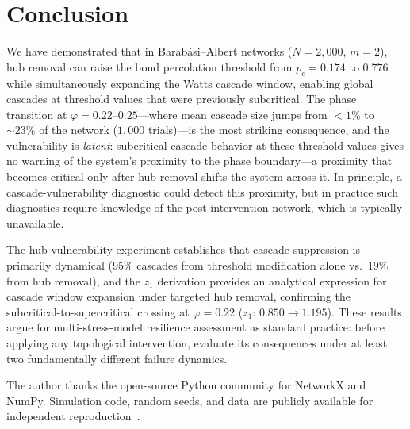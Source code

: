 \documentclass[aps,pre,twocolumn,superscriptaddress,showpacs]{revtex4-2}
\newcommand{\pc}{p_c}
\begin{document}
\section{Conclusion}
\label{sec:conclusion}

We have demonstrated that in Barab\'asi--Albert networks ($N=2{,}000$, $m=2$), hub removal can raise the bond percolation threshold from $\pc=0.174$ to $0.776$ while simultaneously expanding the Watts cascade window, enabling global cascades at threshold values that were previously subcritical. The phase transition at $\varphi=0.22$--$0.25$---where mean cascade size jumps from $<1\%$ to ${\sim}23\%$ of the network ($1{,}000$ trials)---is the most striking consequence, and the vulnerability is \emph{latent}: subcritical cascade behavior at these threshold values gives no warning of the system's proximity to the phase boundary---a proximity that becomes critical only after hub removal shifts the system across it. In principle, a cascade-vulnerability diagnostic could detect this proximity, but in practice such diagnostics require knowledge of the post-intervention network, which is typically unavailable.

The hub vulnerability experiment establishes that cascade suppression is primarily dynamical (95\% cascades from threshold modification alone vs.\ 19\% from hub removal), and the $z_1$ derivation provides an analytical expression for cascade window expansion under targeted hub removal, confirming the subcritical-to-supercritical crossing at $\varphi=0.22$ ($z_1$: $0.850 \to 1.195$). These results argue for multi-stress-model resilience assessment as standard practice: before applying any topological intervention, evaluate its consequences under at least two fundamentally different failure dynamics.

\begin{acknowledgments}
The author thanks the open-source Python community for NetworkX and NumPy. Simulation code, random seeds, and data are publicly available for independent reproduction~\cite{CacheroGitHub2026}.
\end{acknowledgments}
\end{document}
